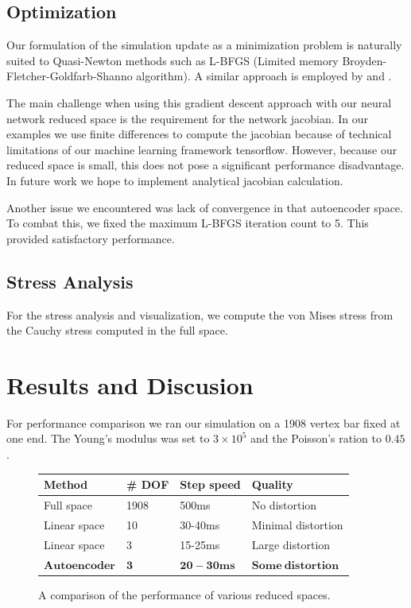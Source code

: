 \documentclass[sigconf, authorversion, review]{acmart}
\begin{document}
\subsection{Optimization}

Our formulation of the simulation update as a minimization problem is naturally suited to Quasi-Newton methods such as L-BFGS (Limited memory Broyden-Fletcher-Goldfarb-Shanno algorithm)\cite{Byrd1994}. A similar approach is employed by \cite{Liu-17} and \cite{Wang-16}.

The main challenge when using this gradient descent approach with our neural network reduced space is the requirement for the network jacobian. In our examples we use finite differences to compute the jacobian because of technical limitations of our machine learning framework tensorflow. However, because our reduced space is small, this does not pose a significant performance disadvantage. In future work we hope to implement analytical jacobian calculation.

Another issue we encountered was lack of convergence in that autoencoder space. To combat this, we fixed the maximum L-BFGS iteration count to 5. This provided satisfactory performance.

\subsection{Stress Analysis}
For the stress analysis and visualization, we compute the von Mises stress from the Cauchy stress computed in the full space.

\section{Results and Discusion}
For performance comparison we ran our simulation on a 1908 vertex bar fixed at one end. The Young's modulus was set to $3\times10^5$ and the Poisson's ration to $0.45$.

\begin{figure}[ht!]
\begin{center}
    \begin{tabular}{| l | l | l | l |}
    \hline
    Method & \# DOF & Step speed & Quality \\ \hline
    Full space & 1908 & 500ms & No distortion \\ \hline
    Linear space & 10 & 30-40ms & Minimal distortion \\ \hline
    Linear space & 3 & 15-25ms & Large distortion \\ \hline
    $\mathbf{Autoencoder}$ & $\mathbf{3}$ & $\mathbf{20-30ms}$ & $\mathbf{Some\ distortion}$ \\
    \hline
    \end{tabular}
\end{center}
\caption{A comparison of the performance of various reduced spaces.}
\label{fig:results-table}
\end{figure}
\end{document}
